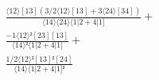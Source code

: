 \documentclass[varwidth, border=5pt]{standalone}
\begin{document}
\begin{my}
$\begin{gathered}
\scriptscriptstyle\frac{⟨12⟩[13](3/2⟨12⟩[13]+3⟨24⟩[34])}{⟨14⟩⟨24⟩⟨1|2+4|1]} +\\
\scriptscriptstyle\frac{-1⟨12⟩²[23][13]}{⟨14⟩²⟨1|2+4|1]} +\\
\scriptscriptstyle\frac{1/2⟨12⟩²[13]²[24]}{⟨14⟩⟨1|2+4|1]²} \phantom{+}
\end{gathered}$
\end{my}
\end{document}

